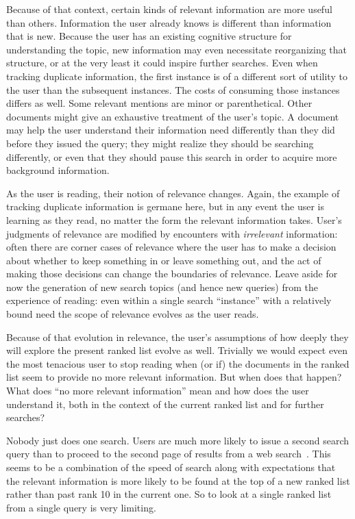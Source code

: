 \documentclass[nobib]{tufte-book}
\begin{document}
Because of that context, certain kinds of relevant information are more useful than others.  Information the user already knows is different than information that is new.  Because the user has an existing cognitive structure for understanding the topic, new information may even necessitate reorganizing that structure, or at the very least it could inspire further searches. Even when tracking duplicate information, the first instance is of a different sort of utility to the user than the subsequent instances.  The costs of consuming those instances differs as well.  Some relevant mentions are minor or parenthetical.  Other documents might give an exhaustive treatment of the user's topic.  A document may help the user understand their information need differently than they did before they issued the query; they might realize they should be searching differently, or even that they should pause this search in order to acquire more background information.

As the user is reading, their notion of relevance changes.  Again, the example of tracking duplicate information is germane here, but in any event the user is learning as they read, no matter the form the relevant information takes.  User's judgments of relevance are modified by encounters with {\em irrelevant} information: often there are corner cases of relevance where the user has to make a decision about whether to keep something in or leave something out, and the act of making those decisions can change the boundaries of relevance.  Leave aside for now the generation of new search topics (and hence new queries) from the experience of reading: even within a single search ``instance'' with a relatively bound need the scope of relevance evolves as the user reads.

Because of that evolution in relevance, the user's assumptions of how deeply they will explore the present ranked list evolve as well.  Trivially we would expect even the most tenacious user to stop reading when (or if) the documents in the ranked list seem to provide no more relevant information.  But when does that happen?  What does ``no more relevant information'' mean and how does the user understand it, both in the context of the current ranked list and for further searches?

Nobody just does one search.  Users are much more likely to issue a second search query than to proceed to the second page of results from a web search~\autocite{ref-missing}.  This seems to be a combination of the speed of search along with expectations that the  relevant information is more likely to be found at the top of a new ranked list rather than past rank 10 in the current one.  So to look at a single ranked list from a single query is very limiting.
\end{document}
